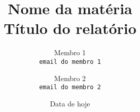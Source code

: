\title{Nome da matéria \\ \large Título do relatório}

\author{
    Membro 1 \\
    {\color{blue}\texttt{email do membro 1}} \and
    Membro 2 \\ 
    {\color{blue}\texttt{email do membro 2}}
}

\date{Data de hoje}

\maketitle

